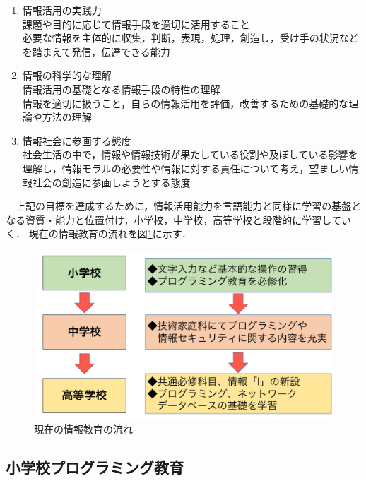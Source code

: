 \documentclass[12pt,a4j,titlepage]{ltjsarticle}
\begin{document}
\begin{enumerate}

\item[1] 情報活用の実践力\mbox{}\\
課題や目的に応じて情報手段を適切に活用すること\\
必要な情報を主体的に収集，判断，表現，処理，創造し，受け手の状況などを踏まえて発信，伝達できる能力

\item[2] 情報の科学的な理解\mbox{}\\
情報活用の基礎となる情報手段の特性の理解\\
情報を適切に扱うこと，自らの情報活用を評価，改善するための基礎的な理論や方法の理解

\item[3] 情報社会に参画する態度\mbox{}\\
社会生活の中で，情報や情報技術が果たしている役割や及ぼしている影響を理解し，情報モラルの必要性や情報に対する責任について考え，望ましい情報社会の創造に参画しようとする態度

\end{enumerate}
　上記の目標を達成するために，情報活⽤能⼒を⾔語能⼒と同様に学習の基盤となる資質・能⼒と位置付け，小学校，中学校，高等学校と段階的に学習していく．
 現在の情報教育の流れを図\ref{fig:kyouiku}に示す．
\\
\begin{figure}[h]
\centering
\includegraphics[clip,width=150mm]{figures/kyouiku.pdf}
\caption[現在の情報教育の流れ]{現在の情報教育の流れ\linebreak}
\label{fig:kyouiku}
\end{figure}

\clearpage

\subsection{小学校プログラミング教育}
\end{document}
